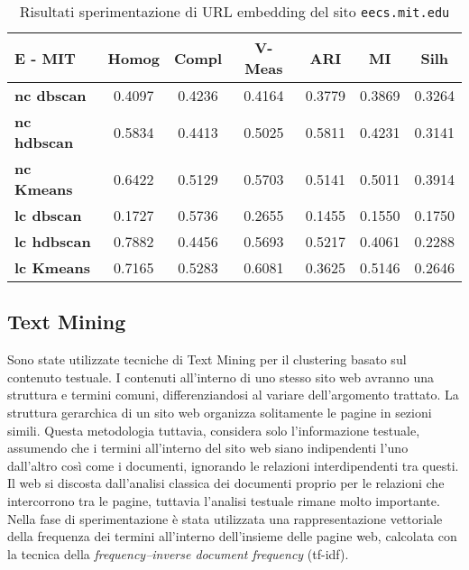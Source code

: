 \begin{table}[H]
	\begin{tabular}{| l | c | c | c | c | c | c |}
	\hline
	\textbf{E - MIT}  & \textbf{Homog} & \textbf{Compl} & \textbf{V-Meas}  & \textbf{ARI}  & \textbf{MI}  & \textbf{Silh} \\ [3ex] \hline
	\textbf{nc dbscan} & 0.4097 & 0.4236 & 0.4164 & 0.3779 & 0.3869 & 0.3264\\ [3ex]
	 \hline 
	\textbf{nc hdbscan} & 0.5834 & 0.4413 & 0.5025 & 0.5811 & 0.4231 & 0.3141\\ [3ex]
	 \hline
	\textbf{nc Kmeans} & 0.6422 & 0.5129 & 0.5703 & 0.5141 & 0.5011 & 0.3914\\ [3ex]
	 \hline	
	\textbf{lc dbscan} & 0.1727 & 0.5736 & 0.2655 & 0.1455 & 0.1550 & 0.1750\\ [3ex]
	\hline
	\textbf{lc hdbscan} & 0.7882 & 0.4456 & 0.5693 & 0.5217 & 0.4061 & 0.2288\\ [3ex]
	\hline
	\textbf{lc Kmeans} & 0.7165 & 0.5283 & 0.6081 & 0.3625 & 0.5146 & 0.2646\\ [3ex]
	\hline
	\end{tabular}
	\caption{Risultati sperimentazione di URL embedding del sito \texttt{eecs.mit.edu}}
	\label{metricheEmbedMit}
\end{table}


\subsection{Text Mining}
Sono state utilizzate tecniche di Text Mining per il clustering basato sul contenuto testuale. I contenuti all'interno di uno stesso sito web avranno una struttura e termini comuni, differenziandosi al variare dell'argomento trattato. La struttura gerarchica di un sito web organizza solitamente le pagine in sezioni simili. Questa metodologia tuttavia, considera solo l'informazione testuale, assumendo che i termini all'interno del sito web siano indipendenti l'uno dall'altro così come i documenti, ignorando le relazioni interdipendenti tra questi. Il web si discosta dall'analisi classica dei documenti proprio per le relazioni che intercorrono tra le pagine, tuttavia l'analisi testuale rimane molto importante.
\\
Nella fase di sperimentazione è stata utilizzata una rappresentazione vettoriale della frequenza dei termini all'interno dell'insieme delle pagine web, calcolata con la tecnica della \textit{frequency–inverse document frequency} (tf-idf).

